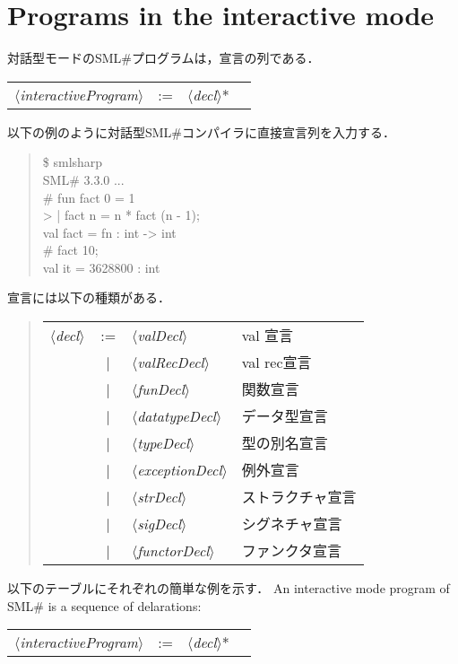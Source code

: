 \documentclass{jbook}
\newcommand{\txt}[2]{#2}
\newcommand{\smlsharp}{SML\#}
\newcommand{\version}{3.3.0}
\newcommand{\vbar}{\mbox{\ $|$\ }}
\newcommand{\nonterm}[1]{\mbox{$\langle$}{\it #1}\mbox{$\rangle$}}
\newenvironment{program}{\begin{quote}\begin{tt}}%
                        {\end{tt}\end{quote}}
\begin{document}
\section{\txt{対話型モードのプログラム}{Programs in the interactive mode}}
\label{spec:sec:program}
\ifjp%
	対話型モードの\smlsharp{}プログラムは，宣言の列である．

\begin{center}
\begin{tabular}{lcll}
\nonterm{interactiveProgram} &:=& \nonterm{decl}*
\end{tabular}
\end{center}

	以下の例のように対話型\smlsharp{}コンパイラに直接宣言列を入力する．
\begin{program}
  \$ smlsharp\\
  SML\# \version{} ...\\
  \# fun fact 0 = 1\\
  >   | fact n = n * fact (n - 1);\\
  val fact = fn : int -> int\\
  \# fact 10;\\
  val it = 3628800 : int
\end{program}

	宣言には以下の種類がある．
\begin{quote}
\begin{tabular}[t]{lcll}
\nonterm{decl} &:=& \nonterm{valDecl} & val 宣言
\\&\vbar& \nonterm{valRecDecl} & val rec宣言
\\&\vbar& \nonterm{funDecl} & 関数宣言
\\&\vbar& \nonterm{datatypeDecl} & データ型宣言
\\&\vbar& \nonterm{typeDecl} & 型の別名宣言
\\&\vbar& \nonterm{exceptionDecl} & 例外宣言
\\&\vbar& \nonterm{strDecl}  & ストラクチャ宣言
\\&\vbar& \nonterm{sigDecl}  & シグネチャ宣言
\\&\vbar& \nonterm{functorDecl}& ファンクタ宣言
\end{tabular}
\end{quote}
	以下のテーブルにそれぞれの簡単な例を示す．
\else%
	An interactive mode program of \smlsharp{} is a sequence of
delarations:
\begin{center}
\begin{tabular}{lcll}
\nonterm{interactiveProgram} &:=& \nonterm{decl}*
\end{tabular}
\end{center}
\end{document}
